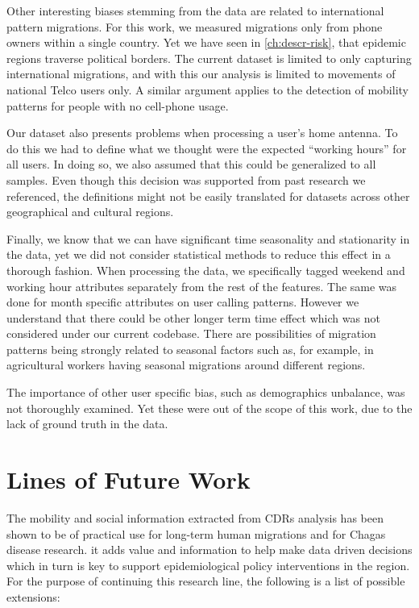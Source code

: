 Other interesting biases stemming from the data are related to international pattern migrations.
For this work, we measured migrations only from phone owners within a single country.
Yet we have seen in \cref{ch:descr-risk}, that  epidemic regions traverse political borders.
The current dataset is limited to only capturing international migrations, and with this our analysis is limited to movements of national Telco users only.
A similar argument applies to the detection of mobility patterns for people with no cell-phone usage.

Our dataset also presents problems when processing a user's home antenna.
To do this we had to define what we thought were the expected ``working hours'' for all users.
In doing so, we also assumed that this could be generalized to all samples. %
Even though this decision was supported from past research we referenced, the definitions might not be easily translated for datasets across other geographical and cultural regions.


Finally, we know that we can have significant time seasonality and stationarity in the data, yet we did not consider statistical methods to reduce this effect in a thorough fashion. %
When processing the data, we specifically tagged weekend and working hour attributes separately from the rest of the features.
The same was done for month specific attributes on user calling patterns.
However we understand that there could be other longer term time effect which was not considered under our current codebase. %
There are possibilities of migration patterns being strongly related to seasonal factors such as, for example, in agricultural workers having seasonal migrations around different regions.%

The importance of other user specific bias, such as demographics unbalance, was not thoroughly examined.
Yet these were out of the scope of this work, due to the lack of ground truth in the data.





\section{ Lines of Future Work }

The mobility and social information extracted from CDRs analysis has been shown to be of practical use for long-term human migrations and for Chagas disease research.
it adds value and information to help make data driven decisions which in turn is key to support epidemiological policy interventions in the region.
For the purpose of continuing this research line, the following is a list of possible extensions:


